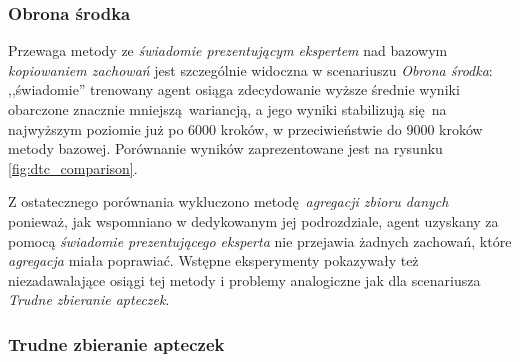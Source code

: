 \subsubsection{Obrona środka}

Przewaga metody ze \textit{świadomie prezentującym ekspertem} nad bazowym \textit{kopiowaniem zachowań} jest szczególnie widoczna w scenariuszu \textit{Obrona środka}: ,,świadomie'' trenowany agent osiąga zdecydowanie wyższe średnie wyniki obarczone znacznie mniejszą wariancją, a jego wyniki stabilizują się na najwyższym poziomie już po 6000 kroków, w przeciwieństwie do 9000 kroków metody bazowej. Porównanie wyników zaprezentowane jest na rysunku \ref{fig:dtc_comparison}.

\begin{figure}[H]
\end{figure}

Z ostatecznego porównania wykluczono metodę \textit{agregacji zbioru danych} ponieważ, jak wspomniano w dedykowanym jej podrozdziale, agent uzyskany za pomocą \textit{świadomie prezentującego eksperta} nie przejawia żadnych zachowań, które \textit{agregacja} miała poprawiać. Wstępne eksperymenty pokazywały też niezadawalające osiągi tej metody i problemy analogiczne jak dla scenariusza \textit{Trudne zbieranie apteczek}.


\subsubsection{Trudne zbieranie apteczek}

